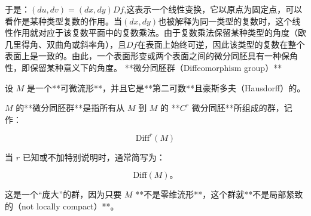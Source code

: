 于是：$(du, dv) = (dx, dy) Df$,这表示一个线性变换，它以原点为固定点，可以看作是某种类型复数的作用。当$(dx, dy)$也被解释为同一类型的复数时，这个线性作用就对应于该复数平面中的复数乘法。由于复数乘法保留某种类型的角度（欧几里得角、双曲角或斜率角），且$Df$在表面上始终可逆，因此该类型的复数在整个表面上是一致的。由此，一个表面形变或两个表面之间的微分同胚具有一种保角性，即保留某种意义下的角度。
**微分同胚群（Diffeomorphism group）**

设 $M$ 是一个**可微流形**，并且它是**第二可数**且\*\*豪斯多夫（Hausdorff）\*\*的。

$M$ 的**微分同胚群**是指所有从 $M$ 到 $M$ 的 **$C^r$ 微分同胚**所组成的群，记作：

$$
\text{Diff}^r(M)
$$

当 $r$ 已知或不加特别说明时，通常简写为：

$$
\text{Diff}(M)。
$$

这是一个“庞大”的群，因为只要 $M$ **不是零维流形**，这个群就**不是局部紧致的（not locally compact）**。
